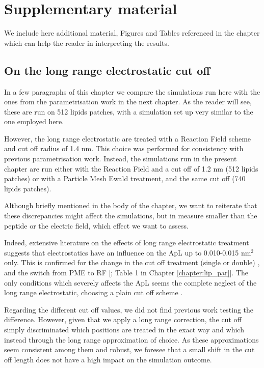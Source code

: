 \section{Supplementary material} \label{sec:ch3_SI}

We include here additional material, Figures and Tables referenced in the chapter which can help the reader in interpreting the results.


\subsection{On the long range electrostatic cut off}
In a few paragraphs of this chapter we compare the simulations run here with the ones from the parametrisation work in the next chapter. As the reader will see, these are run on 512 lipids patches, with a simulation set up very similar to the one employed here.

However, the long range electrostatic are treated with a Reaction Field scheme and cut off radius of 1.4 nm. This choice was performed for consistency with previous parametrisation work.
%
Instead, the simulations run in the present chapter are run either with the Reaction Field and a cut off of 1.2 nm (512 lipids patches) or with a Particle Mesh Ewald treatment, and the same cut off (740 lipids patches).

Although briefly mentioned in the body of the chapter, we want to reiterate that these discrepancies might affect the simulations, but in measure smaller than the peptide or the electric field, which effect we want to assess.

Indeed, extensive literature on the effects of long range electrostatic treatment suggests that electrostatics have an influence on the ApL up to 0.010-0.015 nm$^2$ only. This is confirmed for the change in the cut off treatment (single or double) \citep{Silva2018,Reisser2017}, and the switch from PME to RF [\citet{Poger2012}; Table 1 in Chapter \ref{chapter:lip_par}].
%
The only conditions which severely affects the ApL seems the complete neglect of the long range electrostatic, choosing a plain cut off scheme \citep{Patra2003}.

Regarding the different cut off values, we did not find previous work testing the difference. However, given that we apply a long range correction, the cut off simply discriminated which positions are treated in the exact way and which instead through the long range approximation of choice. As these approximations seem consistent among them and robust, we foresee that a small shift in the cut off length does not have a high impact on the simulation outcome.

